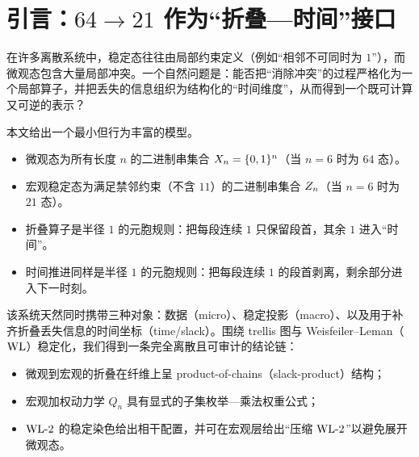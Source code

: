 
\section{引言：$64\to 21$ 作为“折叠—时间”接口}

在许多离散系统中，稳定态往往由局部约束定义（例如“相邻不可同时为 $1$”），而微观态包含大量局部冲突。一个自然问题是：能否把“消除冲突”的过程严格化为一个局部算子，并把丢失的信息组织为结构化的“时间维度”，从而得到一个既可计算又可逆的表示？

本文给出一个最小但行为丰富的模型。
\begin{itemize}
  \item 微观态为所有长度 $n$ 的二进制串集合 $X_n=\{0,1\}^n$（当 $n=6$ 时为 $64$ 态）。
  \item 宏观稳定态为满足禁邻约束（不含 $11$）的二进制串集合 $Z_n$（当 $n=6$ 时为 $21$ 态）。
  \item 折叠算子是半径 $1$ 的元胞规则：把每段连续 $1$ 只保留段首，其余 $1$ 进入“时间”。
  \item 时间推进同样是半径 $1$ 的元胞规则：把每段连续 $1$ 的段首剥离，剩余部分进入下一时刻。
\end{itemize}

该系统天然同时携带三种对象：数据（micro）、稳定投影（macro）、以及用于补齐折叠丢失信息的时间坐标（time/slack）。围绕 trellis 图与 Weisfeiler--Leman（$\mathrm{WL}$）稳定化，我们得到一条完全离散且可审计的结论链：
\begin{itemize}
  \item 微观到宏观的折叠在纤维上呈 product-of-chains（slack-product）结构；
  \item 宏观加权动力学 $Q_n$ 具有显式的子集枚举—乘法权重公式；
  \item $\mathrm{WL}\text{-}2$ 的稳定染色给出相干配置，并可在宏观层给出“压缩 $\mathrm{WL}\text{-}2$”以避免展开微观态。
\end{itemize}

